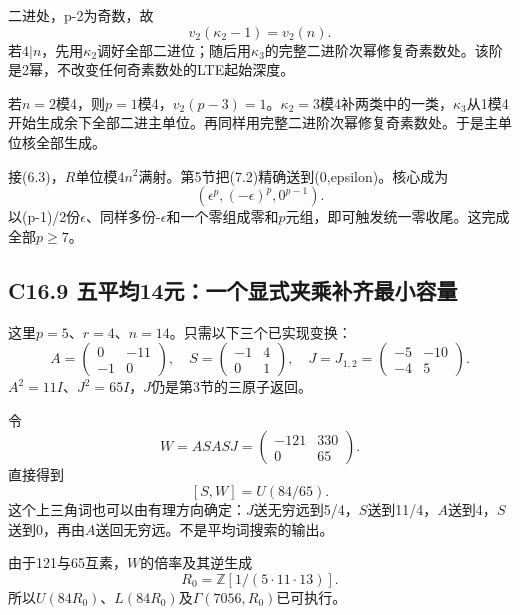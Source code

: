 {二进处，p-2为奇数，故} \[
v_2(\kappa_2-1)=v_2(n).
\] {若\ensuremath{4|n}，先用\ensuremath{\kappa _{2}}调好全部二进位；随后用\ensuremath{\kappa _{3}}的完整二进阶次幂修复奇素数处。该阶是2幂，不改变任何奇素数处的LTE起始深度。}

{若\ensuremath{n=2}模4，则\ensuremath{p=1}模4，\ensuremath{v_{2}(p-3)=1}。\ensuremath{\kappa _{2}=3}模4补两类中的一类，\ensuremath{\kappa _{3}}从1模4开始生成余下全部二进主单位。再同样用完整二进阶次幂修复奇素数处。于是主单位核全部生成。}

{接(6.3)，\ensuremath{R}单位模\ensuremath{4n^{2}}满射。第5节把(7.2)精确送到(0,epsilon)。核心成为} \[
(\epsilon^p,(-\epsilon)^p,0^{p-1}).
\] {以(p-1)/2份\ensuremath{\epsilon }、同样多份-\ensuremath{\epsilon }和一个零组成零和\ensuremath{p}元组，即可触发统一零收尾。这完成全部\ensuremath{p\ge 7}。}

\subsection*{\texorpdfstring{{C16.9} {五平均14元：一个显式夹乘补齐最小容量}}{C16.9 五平均14元：一个显式夹乘补齐最小容量}}\label{C16-h121}

{这里\ensuremath{p=5}、\ensuremath{r=4}、\ensuremath{n=14}。只需以下三个已实现变换：} \[
A=\begin{pmatrix}0&-11\\-1&0\end{pmatrix},\quad
S=\begin{pmatrix}-1&4\\0&1\end{pmatrix},\quad
J=J_{1,2}=\begin{pmatrix}-5&-10\\-4&5\end{pmatrix}.
\] {\ensuremath{A^{2}=11I}、\ensuremath{J^{2}=65I}，\ensuremath{J}仍是第3节的三原子返回。}

{令} \[
W=ASASJ=
\begin{pmatrix}-121&330\\0&65\end{pmatrix}.
\] {直接得到} \[
[S,W]=U(84/65).
\tag{C16.9.1}
\] {这个上三角词也可以由有理方向确定：\ensuremath{J}送无穷远到5/4，\ensuremath{S}送到11/4，\ensuremath{A}送到4，\ensuremath{S}送到0，再由\ensuremath{A}送回无穷远。不是平均词搜索的输出。}

{由于121与65互素，\ensuremath{W}的倍率及其逆生成} \[
R_0=\mathbb Z[1/(5\cdot11\cdot13)].
\] {所以\ensuremath{U(84R_{0})}、\ensuremath{L(84R_{0})}及\ensuremath{\Gamma (7056,R_{0})}已可执行。}

